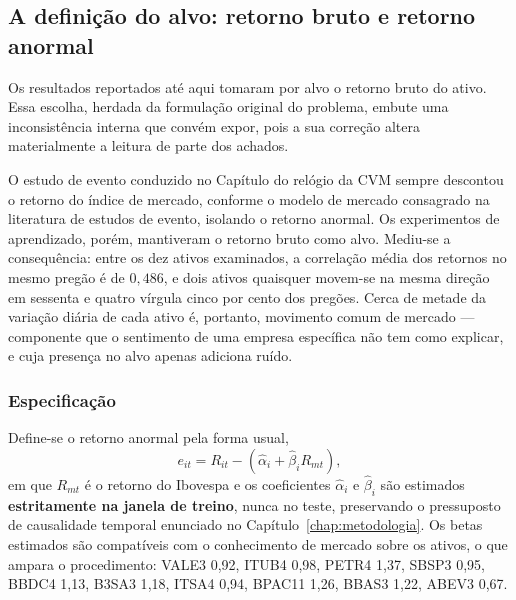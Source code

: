 \subsection{A definição do alvo: retorno bruto e retorno anormal}
\label{sec:retorno_anormal}

Os resultados reportados até aqui tomaram por alvo o retorno bruto do ativo. Essa escolha,
herdada da formulação original do problema, embute uma inconsistência interna que convém expor,
pois a sua correção altera materialmente a leitura de parte dos achados.

O estudo de evento conduzido no Capítulo do relógio da CVM sempre descontou o retorno do
índice de mercado, conforme o modelo de mercado consagrado na literatura de estudos de evento, isolando o
retorno anormal. Os experimentos de aprendizado, porém, mantiveram o retorno bruto como alvo.
Mediu-se a consequência: entre os dez ativos examinados, a correlação média dos retornos no mesmo
pregão é de $0{,}486$, e dois ativos quaisquer movem-se na mesma direção em sessenta e quatro
vírgula cinco por cento dos pregões. Cerca de metade da variação diária de cada ativo é, portanto,
movimento comum de mercado --- componente que o sentimento de uma empresa específica não tem como
explicar, e cuja presença no alvo apenas adiciona ruído.

\subsubsection{Especificação}

Define-se o retorno anormal pela forma usual,
\begin{equation}
e_{it} = R_{it} - \left( \hat{\alpha}_i + \hat{\beta}_i R_{mt} \right),
\end{equation}
em que $R_{mt}$ é o retorno do Ibovespa e os coeficientes $\hat{\alpha}_i$ e $\hat{\beta}_i$ são
estimados \textbf{estritamente na janela de treino}, nunca no teste, preservando o pressuposto de
causalidade temporal enunciado no Capítulo~\ref{chap:metodologia}. Os betas estimados são compatíveis
com o conhecimento de mercado sobre os ativos, o que ampara o procedimento: VALE3 0{,}92, ITUB4 0{,}98, PETR4 1{,}37, SBSP3 0{,}95, BBDC4 1{,}13, B3SA3 1{,}18, ITSA4 0{,}94, BPAC11 1{,}26, BBAS3 1{,}22, ABEV3 0{,}67.

